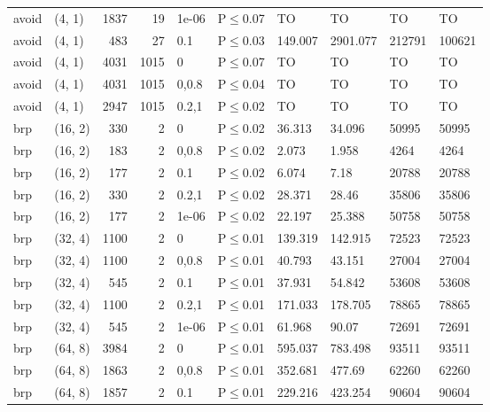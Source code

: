 \begin{longtable}{llrrllllll}
 avoid         & (4, 1)    &   	1837 &   19 & 1e-06 & P$\leq$0.07  & TO      & TO       & TO     & TO     \\
 avoid         & (4, 1)    &    	483 &   27 & 0.1   & P$\leq$0.03  & 149.007 & 2901.077 & 212791 & 100621 \\
 avoid         & (4, 1)    &   	4031 & 1015 & 0     & P$\leq$0.07  & TO      & TO       & TO     & TO     \\
 avoid         & (4, 1)    &   	4031 & 1015 & 0,0.8 & P$\leq$0.04  & TO      & TO       & TO     & TO     \\
 avoid         & (4, 1)    &   	2947 & 1015 & 0.2,1 & P$\leq$0.02  & TO      & TO       & TO     & TO     \\
 brp           & (16, 2)   &    	330 &    2 & 0     & P$\leq$0.02  & 36.313  & 34.096   & 50995  & 50995  \\
 brp           & (16, 2)   &    	183 &    2 & 0,0.8 & P$\leq$0.02  & 2.073   & 1.958    & 4264   & 4264   \\
 brp           & (16, 2)   &    	177 &    2 & 0.1   & P$\leq$0.02  & 6.074   & 7.18     & 20788  & 20788  \\
 brp           & (16, 2)   &    	330 &    2 & 0.2,1 & P$\leq$0.02  & 28.371  & 28.46    & 35806  & 35806  \\
 brp           & (16, 2)   &    	177 &    2 & 1e-06 & P$\leq$0.02  & 22.197  & 25.388   & 50758  & 50758  \\
 brp           & (32, 4)   &   	1100 &    2 & 0     & P$\leq$0.01  & 139.319 & 142.915  & 72523  & 72523  \\
 brp           & (32, 4)   &   	1100 &    2 & 0,0.8 & P$\leq$0.01  & 40.793  & 43.151   & 27004  & 27004  \\
 brp           & (32, 4)   &    	545 &    2 & 0.1   & P$\leq$0.01  & 37.931  & 54.842   & 53608  & 53608  \\
 brp           & (32, 4)   &   	1100 &    2 & 0.2,1 & P$\leq$0.01  & 171.033 & 178.705  & 78865  & 78865  \\
 brp           & (32, 4)   &    	545 &    2 & 1e-06 & P$\leq$0.01  & 61.968  & 90.07    & 72691  & 72691  \\
 brp           & (64, 8)   &   	3984 &    2 & 0     & P$\leq$0.01  & 595.037 & 783.498  & 93511  & 93511  \\
 brp           & (64, 8)   &   	1863 &    2 & 0,0.8 & P$\leq$0.01  & 352.681 & 477.69   & 62260  & 62260  \\
 brp           & (64, 8)   &   	1857 &    2 & 0.1   & P$\leq$0.01  & 229.216 & 423.254  & 90604  & 90604  \\

\end{longtable}
